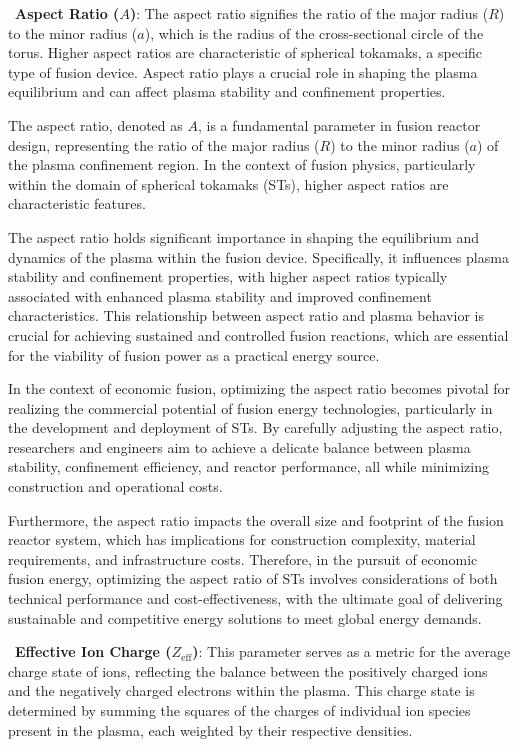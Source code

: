 \documentclass[journal]{IEEEtran}
\begin{document}
~\textbf{Aspect Ratio ($A$)}: The aspect ratio signifies the ratio of the major radius ($R$) to the minor radius ($a$), which is the radius of the cross-sectional circle of the torus. Higher aspect ratios are characteristic of spherical tokamaks, a specific type of fusion device. Aspect ratio plays a crucial role in shaping the plasma equilibrium and can affect plasma stability and confinement properties.

The aspect ratio, denoted as $A$, is a fundamental parameter in fusion reactor design, representing the ratio of the major radius ($R$) to the minor radius ($a$) of the plasma confinement region. In the context of fusion physics, particularly within the domain of spherical tokamaks (STs), higher aspect ratios are characteristic features.

The aspect ratio holds significant importance in shaping the equilibrium and dynamics of the plasma within the fusion device. Specifically, it influences plasma stability and confinement properties, with higher aspect ratios typically associated with enhanced plasma stability and improved confinement characteristics. This relationship between aspect ratio and plasma behavior is crucial for achieving sustained and controlled fusion reactions, which are essential for the viability of fusion power as a practical energy source.

In the context of economic fusion, optimizing the aspect ratio becomes pivotal for realizing the commercial potential of fusion energy technologies, particularly in the development and deployment of STs. By carefully adjusting the aspect ratio, researchers and engineers aim to achieve a delicate balance between plasma stability, confinement efficiency, and reactor performance, all while minimizing construction and operational costs.

Furthermore, the aspect ratio impacts the overall size and footprint of the fusion reactor system, which has implications for construction complexity, material requirements, and infrastructure costs. Therefore, in the pursuit of economic fusion energy, optimizing the aspect ratio of STs involves considerations of both technical performance and cost-effectiveness, with the ultimate goal of delivering sustainable and competitive energy solutions to meet global energy demands.

~\textbf{Effective Ion Charge ($Z_{\text{eff}}$)}: This parameter serves as a metric for the average charge state of ions, reflecting the balance between the positively charged ions and the negatively charged electrons within the plasma. This charge state is determined by summing the squares of the 
charges of individual ion species present in the plasma, each weighted by their respective densities.
\end{document}
